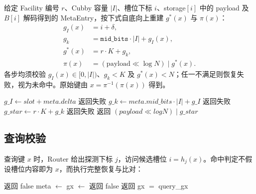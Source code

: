 给定 Facility 编号 \(r\)、Cubby 容量 \(|I|\)、槽位下标 \(i\)、storage\([i]\) 中的 payload 及 \(B[i]\) 解码得到的 MetaEntry，按下式自底向上重建 \(g^\ast(x)\) 与 \(\pi(x)\)：
\begin{align}
  g_I(x) &= i+\delta, \\
  g_k &= \texttt{mid\_bits}\cdot|I|+g_I(x), \\
  g^\ast(x) &= r\cdot K+g_k, \\
  \pi(x) &= (\mathrm{payload}\ll\log N)\;\vert\; g^\ast(x).
\end{align}
各步均须校验 \(g_I(x)\in[0,|I|)\)、\(g_k<K\) 及 \(g^\ast(x)<N\)；任一不满足则恢复失败，视为未命中。原始键由 \(x=\pi^{-1}(\pi(x))\) 得到。

\begin{algorithm}[htbp]
  \caption{ReconstructGxPi：从槽位上下文恢复 \(\pi(x)\)}
  \label{alg:reconstruct-gx}
  \begin{algorithmic}[1]
      \State $\mathit{g\_I}\gets \mathit{slot}+\mathit{meta.delta}$
      \If{$\mathit{g\_I}\notin[0,|I|)$} \State 返回失败 \EndIf
      \State $\mathit{g\_k}\gets \mathit{meta.mid\_bits}\cdot|I|+\mathit{g\_I}$
       \State 返回失败 \EndIf
      \State $\mathit{g\_star}\gets r\cdot K+\mathit{g\_k}$
       \State 返回失败 \EndIf
      \State 返回 $(\mathit{payload}\ll\mathit{logN})\;\vert\;\mathit{g\_star}$
    \EndFunction
  \end{algorithmic}
\end{algorithm}

\subsection{查询校验}

查询键 \(x\) 时，Router 给出探测下标 \(j\)，访问候选槽位 \(i=h_j(x)\)。命中判定不假设槽位内容即为 \(x\)，而执行完整恢复与比对：

\begin{algorithm}[htbp]
  \caption{SlotPiMatches：槽位命中校验}
  \label{alg:slot-match}
  \begin{algorithmic}[1]
       \State 返回 false \EndIf
      \State meta $\gets$ 
      \State gx $\gets$ 
       \State 返回 false \EndIf
      \State 返回 gx $=$ query\_gx
    \EndFunction
  \end{algorithmic}
\end{algorithm}


